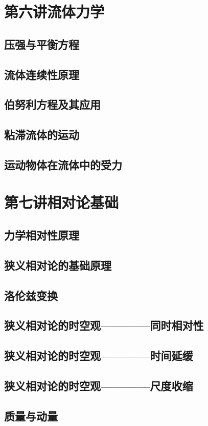\documentclass[UTF8]{article}
\begin{document}
\section{第六讲\;\;流体力学}
\subsection{压强与平衡方程}
\subsection{流体连续性原理}
\subsection{伯努利方程及其应用}
\subsection{粘滞流体的运动}
\subsection{运动物体在流体中的受力}
\section{第七讲\;\;相对论基础}
\subsection{力学相对性原理}
\subsection{狭义相对论的基础原理}
\subsection{洛伦兹变换}
\subsection{狭义相对论的时空观————同时相对性}
\subsection{狭义相对论的时空观————时间延缓}
\subsection{狭义相对论的时空观————尺度收缩}
\subsection{质量与动量}
\end{document}
